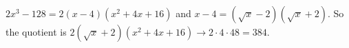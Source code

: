 $2x^3-128=2(x-4)(x^2+4x+16)$ and $x-4=(\sqrt x-2)(\sqrt x+2)$. So the quotient is $2(\sqrt x+2)(x^2+4x+16)\to2\cdot4\cdot48=\boxed{384}$.
